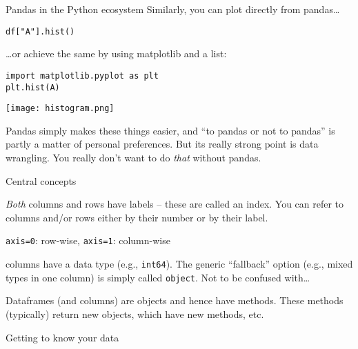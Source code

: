\begin{frame}[fragile]{Pandas in the Python ecosystem}
 Similarly, you can plot directly from pandas\ldots
\begin{verbatim}
df["A"].hist()
\end{verbatim}
\ldots or achieve the same by using matplotlib and a list:
\begin{verbatim}
import matplotlib.pyplot as plt
plt.hist(A)
\end{verbatim}

\centering

\texttt{[image: histogram.png]}\hfill

\end{frame}


\begin{frame}[standout]
  Pandas simply makes these things easier, and ``to pandas or not to pandas'' is partly a matter of personal preferences. But its really strong point is data wrangling. You really don't want to do \emph{that} without pandas.

\end{frame}








\begin{frame}
  \begin{block}{Central concepts}
  \begin{description}[<+>]
  \item[index]\emph{Both} columns and rows have labels -- these are called an index. You can refer to columns and/or rows either by their number or by their label.
  \item[axis] \texttt{axis=0}:  row-wise, \texttt{axis=1}: column-wise
  \item[dtype]columns have a data type (e.g., \texttt{int64}). The generic ``fallback'' option (e.g., mixed types in one column) is simply called \texttt{object}. Not to be confused with\ldots
  \item[object-orientation] Dataframes (and columns) are objects and hence have methods. These methods (typically) return new objects, which have new methods, etc.
  \end{description}
\end{block}
\end{frame}

\begin{frame}[fragile]{Getting to know your data}
  \end{frame}
  
